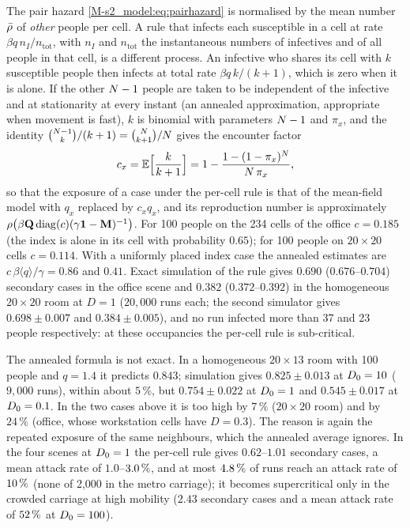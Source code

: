 \begin{remark}\label{s5_pair:rem:encounter}
The pair hazard \eqref{M-s2_model:eq:pairhazard} is normalised by the mean number $\bar{\rho}$ of \emph{other} people per
cell. A rule that infects each susceptible in a cell at rate $\beta q\,n_I/n_{\mathrm{tot}}$, with $n_I$ and
$n_{\mathrm{tot}}$ the instantaneous numbers of infectives and of all people in that cell, is a different process.
An infective who shares its cell with $k$ susceptible people then infects at total rate $\beta q\,k/(k+1)$, which is
zero when it is alone. If the other $N-1$ people are taken to be independent of the infective and at
stationarity at every instant (an annealed approximation, appropriate when movement is fast), $k$ is binomial with
parameters $N-1$ and $\pi_x$, and the identity $\binom{N-1}{k}/(k+1)=\binom{N}{k+1}/N$ gives the
encounter factor
\[
  c_x=\mathbb{E}\Bigl[\frac{k}{k+1}\Bigr]=1-\frac{1-(1-\pi_x)^{N}}{N\,\pi_x},
\]
so that the exposure of a case under the per-cell rule is that of the mean-field model with $q_x$ replaced by
$c_xq_x$, and its reproduction number is approximately $\rho\bigl(\beta\mathbf{Q}\operatorname{diag}(c)(\gamma\mathbf{1}-\mathbf{M})^{-1}\bigr)$.
For 100 people on the 234 cells of the office $c=0.185$ (the index is alone in its cell with probability
$0.65$); for 100 people on $20\times20$ cells $c=0.114$. With a uniformly placed index case the annealed
estimates are $c\,\beta\langle q\rangle/\gamma=0.86$ and $0.41$. Exact simulation of the rule gives $0.690$
($0.676$--$0.704$) secondary cases in the office scene and $0.382$ ($0.372$--$0.392$) in the homogeneous
$20\times20$ room at $D=1$ ($20{,}000$ runs each; the second simulator gives $0.698\pm0.007$ and $0.384\pm0.005$),
and no run infected more than 37 and 23 people respectively: at these occupancies the per-cell rule is
sub-critical.

The annealed formula is not exact. In a homogeneous $20\times13$ room with 100 people and $q=1.4$ it predicts
$0.843$; simulation gives $0.825\pm0.013$ at $D_0=10$ ($9{,}000$ runs), within about $5\,\%$, but
$0.754\pm0.022$ at $D_0=1$ and $0.545\pm0.017$ at $D_0=0.1$. In the two cases above it is too high by $7\,\%$
($20\times20$ room) and by $24\,\%$ (office, whose workstation cells have $D=0.3$). The reason is again the
repeated exposure of the same neighbours, which the annealed average ignores. In the four scenes at $D_0=1$ the
per-cell rule gives $0.62$--$1.01$ secondary cases, a mean attack rate of $1.0$--$3.0\,\%$, and at most $4.8\,\%$ of
runs reach an attack rate of $10\,\%$ (none of 2{,}000 in the metro carriage); it becomes supercritical only in the
crowded carriage at high mobility ($2.43$ secondary cases and a mean attack rate of $52\,\%$ at $D_0=100$).
\end{remark}
